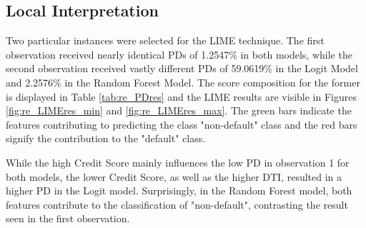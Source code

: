 \subsection{Local Interpretation}
Two particular instances were selected for the \ac{LIME} technique. The first observation received nearly identical PDs of 1.2547\% in both models, while the second observation received vastly different PDs of 59.0619\% in the Logit Model and 2.2576\% in the Random Forest Model. The score composition for the former is displayed in Table \ref{tab:re_PDres} and the \ac{LIME} results are visible in Figures \ref{fig:re_LIMEres_min} and \ref{fig:re_LIMEres_max}. The green bars indicate the features contributing to predicting the class "non-default" class and the red bars signify the contribution to the "default" class. 

While the high Credit Score mainly influences the low PD in observation 1 for both models, the lower Credit Score, as well as the higher DTI, resulted in a higher PD in the Logit model. Surprisingly, in the Random Forest model, both features contribute to the classification of "non-default", contrasting the result seen in the first observation.

